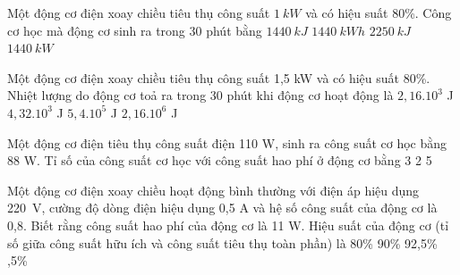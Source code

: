 \begin{vidu} %
	Một động cơ điện xoay chiều tiêu thụ công suất $1\ kW$ và có hiệu suất 80\%. Công cơ học mà động cơ sinh ra trong 30 phút bằng
	\choice
	{\True $1440\ kJ$}
	{$1440\ kWh$}
	{$2250 \ kJ$}
	{$1440\ kW$}
\end{vidu}
\begin{vidu} %
	Một động cơ điện xoay chiều tiêu thụ công suất 1,5 kW và có hiệu suất 80\%. Nhiệt lượng do động cơ toả ra trong 30 phút khi động cơ hoạt động là
	\choice
	{$2,16.10^3$ J}
	{$4,32.10^3$ J}
	{\True $5,4.10^5$ J}
	{$2,16.10^6$ J}
\end{vidu}
\begin{vidu} %
	Một động cơ điện tiêu thụ công suất điện 110 W, sinh ra công suất cơ học bằng 88 W. Tỉ số của công suất cơ học với công suất hao phí ở động cơ bằng
	\choice
	{3}
	{}
	{2}
	{5}
\end{vidu}
\begin{vidu} %
	 Một động cơ điện xoay chiều hoạt động bình thường với điện áp hiệu dụng 220\ V, cường độ dòng điện hiệu dụng 0,5 A và hệ số công suất của động cơ là 0,8. Biết rằng công suất hao phí của động cơ là 11 W. Hiệu suất của động cơ (tỉ số giữa công suất hữu ích và công suất tiêu thụ toàn phần) là
	\choice
	{80\%}
	{90\%}
	{92,5\%}
	{,5\%}
\end{vidu}
